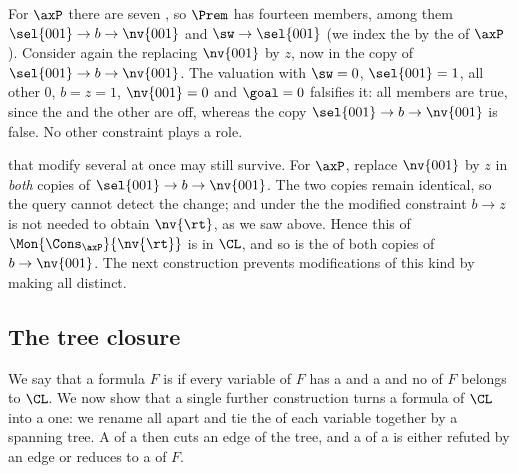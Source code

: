 \begin{example}\label{ex:P-selectors}
For $\axP$ there are seven , so $\Prem$ has fourteen
members, among them $\sel{001}\to b\to\nv{001}$ and $\sw\to\sel{001}$
(we index the  by the  of $\axP$). Consider
again the  replacing $\nv{001}$ by $z$, now in the
 copy of $\sel{001}\to b\to\nv{001}$. The valuation with $\sw=0$,
$\sel{001}=1$, all other  $0$, $b=z=1$, $\nv{001}=0$ and
$\goal=0$ falsifies it: all  members are true, since the
 and the other  are off, whereas the 
copy $\sel{001}\to b\to\nv{001}$ is false. No other constraint plays a
role.
\end{example}

 that modify several  at once may still
survive. For $\axP$, replace $\nv{001}$ by $z$ in \emph{both} copies of
$\sel{001}\to b\to\nv{001}$. The two copies remain identical, so the query
cannot detect the change; and under the  the modified constraint
$b\to z$ is not needed to obtain $\nv{\rt}$, as we saw above. Hence this
 of $\Mon{\Cons_{\axP}}{\nv{\rt}}$ is in $\CL$, and so is the
 of both copies of $b\to\nv{001}$. The next construction
prevents modifications of this kind by making all 
distinct.

\subsection{The tree closure}\label{sec:minimality}

\AP We say that a formula $F$ is  if every variable
of $F$ has a  and a   and no
 of $F$ belongs to $\CL$. We now show that a single further
construction turns a  formula of $\CL$ into a
 one: we rename all  apart and tie the
 of each variable together by a spanning tree. A 
of a  then cuts an edge of the tree, and a  of a
 is either refuted by an edge or reduces to a  of
$F$.

